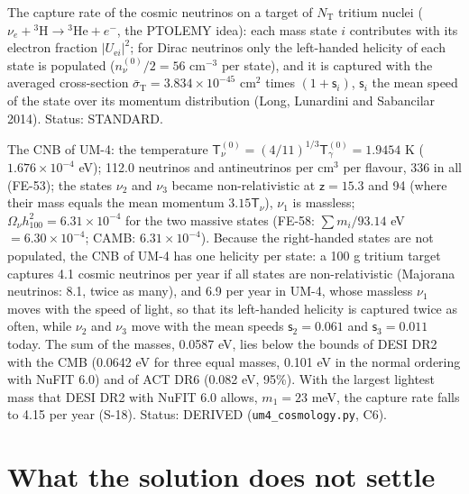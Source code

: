 \documentclass[
  10pt,
]{article}
\begin{document}
The capture rate of the cosmic neutrinos on a target of
\(N_{\mathrm{T}}\) tritium nuclei
(\(\nu_e + {}^3\mathrm{H} \to {}^3\mathrm{He} + e^-\), the PTOLEMY
idea): each mass state \(i\) contributes with its electron fraction
\(\lvert U_{\mathrm{e}i}\rvert^2\); for Dirac neutrinos only the
left-handed helicity of each state is populated (\(n_\nu^{(0)}/2 = 56\)
cm\(^{-3}\) per state), and it is captured with the averaged
cross-section \(\bar\sigma_{\mathrm{T}} = 3.834\times10^{-45}\) cm\(^2\)
times \((1 + \mathsf{s}_i)\), \(\mathsf{s}_i\) the mean speed of the
state over its momentum distribution (Long, Lunardini and Sabancilar
2014). Status: STANDARD.

The CNB of UM-4: the temperature
\(\mathsf{T}_\nu^{(0)} = (4/11)^{1/3}\mathsf{T}_\gamma^{(0)} = 1.9454\)
K (\(1.676\times10^{-4}\) eV); 112.0 neutrinos and antineutrinos per
cm\(^3\) per flavour, 336 in all (FE-53); the states \(\nu_2\) and
\(\nu_3\) became non-relativistic at \(\mathsf{z} = 15.3\) and 94 (where
their mass equals the mean momentum \(3.15\mathsf{T}_\nu\)), \(\nu_1\)
is massless; \(\Omega_\nu h_{100}^2 = 6.31\times10^{-4}\) for the two
massive states (FE-58: \(\sum m_i/93.14\) eV \(= 6.30\times10^{-4}\);
CAMB: \(6.31\times10^{-4}\)). Because the right-handed states are not
populated, the CNB of UM-4 has one helicity per state: a 100 g tritium
target captures 4.1 cosmic neutrinos per year if all states are
non-relativistic (Majorana neutrinos: 8.1, twice as many), and 6.9 per
year in UM-4, whose massless \(\nu_1\) moves with the speed of light, so
that its left-handed helicity is captured twice as often, while
\(\nu_2\) and \(\nu_3\) move with the mean speeds
\(\mathsf{s}_2 = 0.061\) and \(\mathsf{s}_3 = 0.011\) today. The sum of
the masses, 0.0587 eV, lies below the bounds of DESI DR2 with the CMB
(0.0642 eV for three equal masses, 0.101 eV in the normal ordering with
NuFIT 6.0) and of ACT DR6 (0.082 eV, 95\%). With the largest lightest
mass that DESI DR2 with NuFIT 6.0 allows, \(m_1 = 23\) meV, the capture
rate falls to 4.15 per year (S-18). Status: DERIVED
(\texttt{um4\_cosmology.py}, C6).

\hypertarget{what-the-solution-does-not-settle}{%
\section{What the solution does not
settle}\label{what-the-solution-does-not-settle}}
\end{document}
